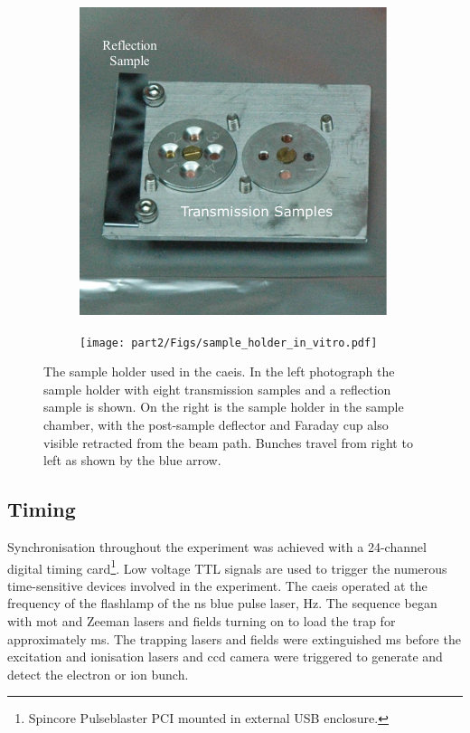 \begin{figure}
    \centering
    \begin{subfigure}{0.49\linewidth}
    \centering
    \includegraphics[width=\linewidth]{part2/Figs/sample_holder_alone.pdf}
    \end{subfigure}
    \begin{subfigure}{0.49\linewidth}
    \centering
    \texttt{[image: part2/Figs/sample\_holder\_in\_vitro.pdf]}
    \end{subfigure}
    \caption[Sample holder.]{The sample holder used in the \gls{caeis}. In the left photograph the sample holder with eight transmission samples and a reflection sample is shown. On the right is the sample holder in the sample chamber, with the post-sample deflector and Faraday cup also visible retracted from the beam path. Bunches travel from right to left as shown by the blue arrow.}
    \label{figure:sample_holder}
\end{figure}

\subsection{Timing}\label{section:pulse_blaster}

Synchronisation throughout the experiment was achieved with a 24-channel digital timing card\footnote{Spincore Pulseblaster PCI mounted in external USB enclosure.}.
Low voltage TTL signals are used to trigger the numerous time-sensitive devices involved in the experiment.
The \gls{caeis} operated at the frequency of the flashlamp of the \unit[5]{ns} blue pulse laser, \unit[10]{Hz}.
The sequence began with \gls{mot} and Zeeman lasers and fields turning on to load the trap for approximately \unit[90]{ms}.
The trapping lasers and fields were extinguished \unit[5]{ms} before the excitation and ionisation lasers and \gls{ccd} camera were triggered to generate and detect the electron or ion bunch.

